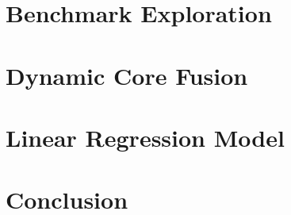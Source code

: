 \section{Benchmark Exploration}\label{sec:expl}


\section{Dynamic Core Fusion}\label{sec:dynamic}



\section{Linear Regression Model}\label{sec:model}


%

\section{Conclusion}\label{sec:conc}
